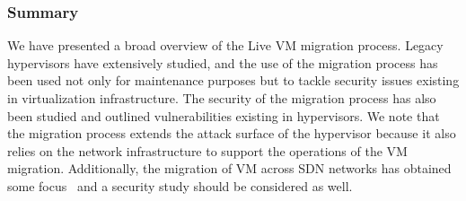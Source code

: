 \subsubsection{Summary}
We have presented a broad overview of the Live VM migration process.
Legacy hypervisors have extensively studied, and the use of the migration process has been used not only for maintenance purposes but to tackle security issues existing in virtualization infrastructure.
The security of the migration process has also been studied and outlined vulnerabilities existing in hypervisors.
We note that the migration process extends the attack surface of the hypervisor because it also relies on the network infrastructure to support the operations of the VM migration.
Additionally, the migration of VM across SDN networks has obtained some focus~\cite{Datacenters2014,Lin2013,Ibn-Khedher2015} and a security study should be considered as well.